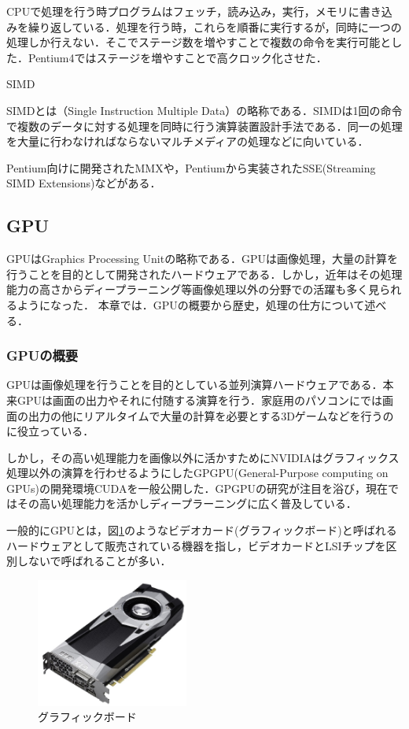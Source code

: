 \documentclass[a4j,12pt]{jsarticle}
\begin{document}
CPUで処理を行う時プログラムはフェッチ，読み込み，実行，メモリに書き込みを繰り返している．処理を行う時，これらを順番に実行するが，同時に一つの処理しか行えない．そこでステージ数を増やすことで複数の命令を実行可能とした．Pentium4ではステージを増やすことで高クロック化させた．

\begin{Large}
SIMD
\end{Large}

SIMDとは（Single Instruction Multiple Data）の略称である．SIMDは1回の命令で複数のデータに対する処理を同時に行う演算装置設計手法である．同一の処理を大量に行わなければならないマルチメディアの処理などに向いている．

Pentium向けに開発されたMMXや，Pentiumから実装されたSSE(Streaming SIMD Extensions)などがある．

\subsection{GPU}
GPUはGraphics Processing Unitの略称である．GPUは画像処理，大量の計算を行うことを目的として開発されたハードウェアである．しかし，近年はその処理能力の高さからディープラーニング等画像処理以外の分野での活躍も多く見られるようになった．
本章では．GPUの概要から歴史，処理の仕方について述べる．


\subsubsection{GPUの概要}
GPUは画像処理を行うことを目的としている並列演算ハードウェアである．本来GPUは画面の出力やそれに付随する演算を行う．家庭用のパソコンにでは画面の出力の他にリアルタイムで大量の計算を必要とする3Dゲームなどを行うのに役立っている．

しかし，その高い処理能力を画像以外に活かすためにNVIDIAはグラフィックス処理以外の演算を行わせるようにしたGPGPU(General-Purpose computing on GPUs)の開発環境CUDAを一般公開した．GPGPUの研究が注目を浴び，現在ではその高い処理能力を活かしディープラーニングに広く普及している．

一般的にGPUとは，図\ref{fig:gpu}のようなビデオカード(グラフィックボード)と呼ばれるハードウェアとして販売されている機器を指し，ビデオカードとLSIチップを区別しないで呼ばれることが多い．

\begin{figure}[htbp]
 \begin{center}
  \includegraphics[width=50mm]{GPU.pdf}
 \end{center}
 \caption{グラフィックボード}
 \label{fig:gpu}
\end{figure}
\end{document}

